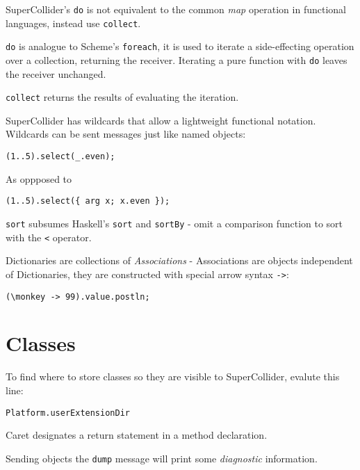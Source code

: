 \documentclass{article}
\begin{document}
SuperCollider's \texttt{do} is not equivalent to the common 
\emph{map} operation in functional languages, instead use 
\texttt{collect}.

\texttt{do} is analogue to Scheme's \texttt{foreach}, it is used 
to iterate a side-effecting operation over a collection, returning
the receiver. Iterating a pure function with \texttt{do} leaves 
the receiver unchanged. 

\texttt{collect} returns the results of evaluating the iteration.

SuperCollider has wildcards that allow a lightweight functional 
notation. Wildcards can be sent messages just like named objects:

\begin{verbatim}
(1..5).select(_.even);
\end{verbatim}

As oppposed to
\begin{verbatim}
(1..5).select({ arg x; x.even });
\end{verbatim}


\texttt{sort} subsumes Haskell's \texttt{sort} and 
\texttt{sortBy} - omit a comparison function to sort with the 
\texttt{<} operator.

Dictionaries are collections of \emph{Associations} - Associations 
are objects independent of Dictionaries, they are constructed with
special arrow syntax \texttt{->}:

\begin{verbatim}
(\monkey -> 99).value.postln;
\end{verbatim}


\section{Classes}

To find where to store classes so they are visible to 
SuperCollider, evalute this line:

\begin{verbatim}
Platform.userExtensionDir
\end{verbatim}

Caret designates a return statement in a method declaration.

Sending objects the \texttt{dump} message will print some 
\emph{diagnostic} information.

\end{document}
